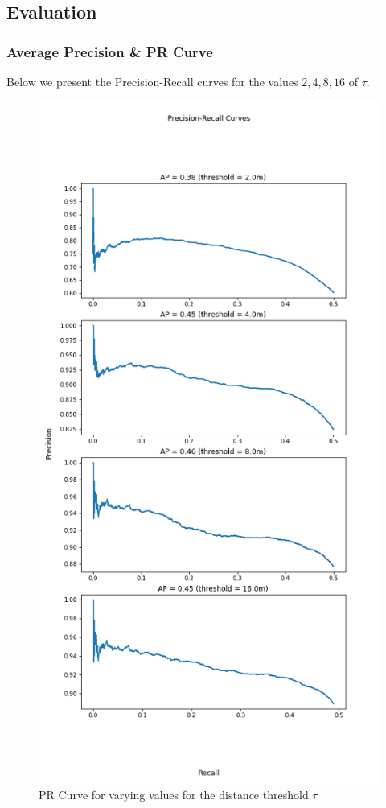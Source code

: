 \documentclass[letter]{article}
\begin{document}
	\subsection{Evaluation}
	\setcounter{subsubsection}{2}
	\subsubsection{Average Precision \& PR Curve}
	Below we present the Precision-Recall curves for the values $2, 4, 8, 16$ of $\tau$.
	\begin{figure}[h]
		\centering
		\includegraphics[scale=0.42]{images/prcurve-normal.png}
		\caption{PR Curve for varying values for the distance threshold $\tau$}
		\label{fig:prcurve}
	\end{figure}
\end{document}
